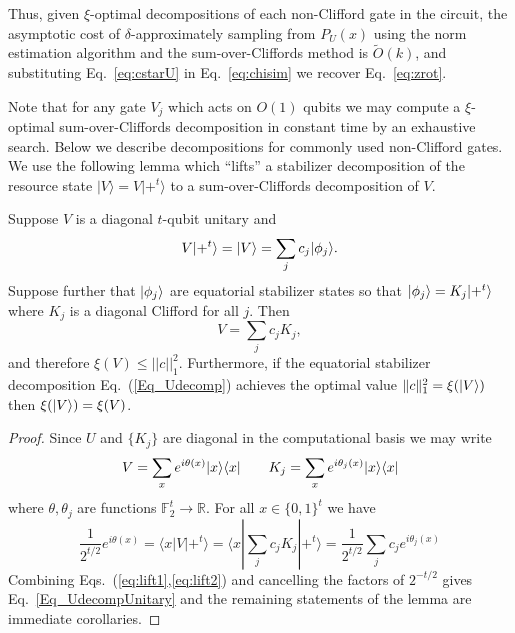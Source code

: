 Thus, given $\xi$-optimal decompositions of each non-Clifford gate in the circuit, the asymptotic cost of $\delta$-approximately sampling from $P_U(x)$ using the norm estimation algorithm and the sum-over-Cliffords method is  $\tilde{O}(k)$, and substituting Eq.~\eqref{eq:cstarU} in Eq.~\eqref{eq:chisim} we recover Eq.~\eqref{eq:zrot}.

Note that for any gate $V_j$ which acts on $O(1)$ qubits we may compute a $\xi$-optimal sum-over-Cliffords decomposition in constant time by an exhaustive search. Below we describe decompositions for commonly used non-Clifford gates. We use the following lemma which ``lifts''  a stabilizer decomposition of the resource state $|V\rangle=V|+^t\rangle$ to a sum-over-Cliffords decomposition of $V$.

\begin{lemma}
Suppose $V$ is a diagonal $t$-qubit unitary and
	\begin{equation}
		\label{Eq_Udecomp}
			V|+^t\rangle=\vert V\rangle = \sum_j c_j \vert \phi_j \rangle.
	\end{equation}	
Suppose further that $ \vert \phi_j \rangle$ are equatorial stabilizer states so that $ \vert \phi_j \rangle= K_j \vert+^t\rangle$ where $K_j$ is a diagonal Clifford for all $j$. Then
	\begin{equation}
		\label{Eq_UdecompUnitary}
	V = \sum_j c_j K_j ,
\end{equation}	
and therefore $\xi(V) \leq || c ||_1^2$.  Furthermore, if the equatorial stabilizer decomposition Eq.~(\ref{Eq_Udecomp}) achieves the optimal value $\| c \|_1^2 = \xi(\vert V\rangle)$ then  $\xi(\vert V\rangle)=\xi(V)$.
\end{lemma}
\begin{proof}
Since $U$ and $\{K_j\}$ are diagonal in the computational basis we may write
\begin{equation}
V= \sum_{x} e^{i \theta(x) } \vert x \rangle \langle x \vert \qquad K_j = \sum_{x}  e^{i \theta_{j}(x)} \vert x \rangle \langle x \vert
\label{eq:lift1}
\end{equation}
where $\theta, \theta_j$ are functions $\mathbb{F}_2^t \rightarrow \mathbb{R}$.  For all $x\in \{0,1\}^t$ we have
\begin{equation}
\frac{1}{2^{t/2}} e^{i\theta(x)}=\langle x|V|+^t\rangle=\langle x|\sum_{j} c_j K_j|+^t\rangle=\frac{1}{2^{t/2}}  \sum_{j} c_j  e^{i \theta_j(x)}
\label{eq:lift2}
\end{equation}
Combining Eqs.~(\ref{eq:lift1},\ref{eq:lift2}) and cancelling the factors of $2^{-t/2}$ gives Eq.~\eqref{Eq_UdecompUnitary} and the remaining statements of the lemma are immediate corollaries.
\end{proof}

